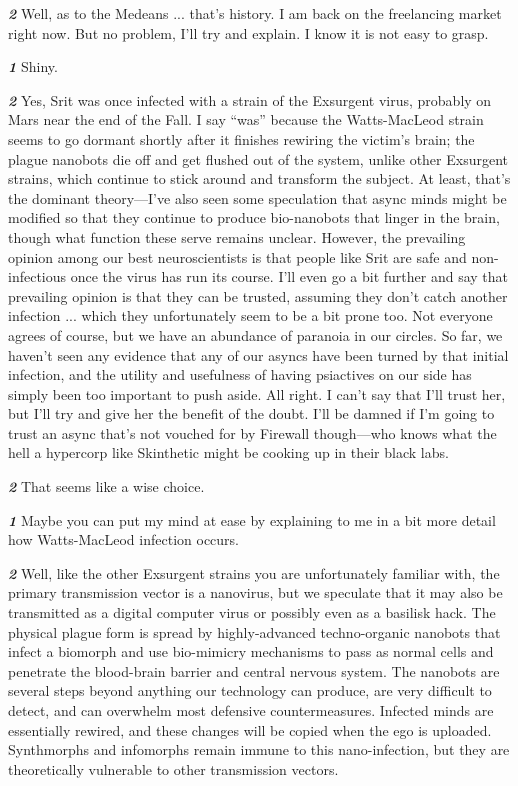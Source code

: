 \textbf{\textit{2}} Well, as to the Medeans ... that’s history.
I am back on the freelancing market
right now. But no problem, I’ll try and
explain. I know it is not easy to grasp.

\textbf{\textit{1}} Shiny.

\textbf{\textit{2}} Yes, Srit was once infected with a
strain of the Exsurgent virus, probably
on Mars near the end of the Fall. I say
“was” because the Watts-MacLeod
strain seems to go dormant shortly
after it finishes rewiring the victim’s
brain; the plague nanobots die off and
get flushed out of the system, unlike
other Exsurgent strains, which continue
to stick around and transform
the subject. At least, that’s the dominant
theory—I’ve also seen some
speculation that async minds might
be modified so that they continue to
produce bio-nanobots that linger in
the brain, though what function these
serve remains unclear. However, the
prevailing opinion among our best
neuroscientists is that people like Srit
are safe and non-infectious once the
virus has run its course. I’ll even go
a bit further and say that prevailing
opinion is that they can be trusted,
assuming they don’t catch another
infection ... which they unfortunately
seem to be a bit prone too. Not everyone
agrees of course, but we have an
abundance of paranoia in our circles.
So far, we haven’t seen any evidence
that any of our asyncs have been
turned by that initial infection, and the
utility and usefulness of having psiactives
on our side has simply been
too important to push aside.
All right. I can’t say that I’ll trust her,
but I’ll try and give her the benefit of
the doubt. I’ll be damned if I’m going
to trust an async that’s not vouched
for by Firewall though—who knows
what the hell a hypercorp like Skinthetic
might be cooking up in their
black labs.

\textbf{\textit{2}} That seems like a wise choice.

\textbf{\textit{1}} Maybe you can put my mind at ease
by explaining to me in a bit more
detail how Watts-MacLeod infection
occurs.

\textbf{\textit{2}} Well, like the other Exsurgent strains
you are unfortunately familiar with,
the primary transmission vector is a
nanovirus, but we speculate that it
may also be transmitted as a digital
computer virus or possibly even as
a basilisk hack. The physical plague
form is spread by highly-advanced
techno-organic nanobots that infect
a biomorph and use bio-mimicry
mechanisms to pass as normal cells
and penetrate the blood-brain barrier
and central nervous system. The
nanobots are several steps beyond
anything our technology can produce,
are very difficult to detect, and can
overwhelm most defensive countermeasures.
Infected minds are essentially
rewired, and these changes will
be copied when the ego is uploaded.
Synthmorphs and infomorphs remain
immune to this nano-infection, but
they are theoretically vulnerable to
other transmission vectors.

